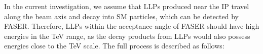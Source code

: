 \documentclass[preprint, superscriptaddress,amsmath, nofootinbib]{revtex4-1}
\begin{document}
In the current investigation, we assume that LLPs produced near the IP travel along the beam axis and decay into SM particles, which can be detected by FASER. Therefore, LLPs within the acceptance angle of FASER should have high energies in the TeV range, as the decay products from LLPs would also possess energies close to the TeV scale. The full process is described as follows:
\end{document}
